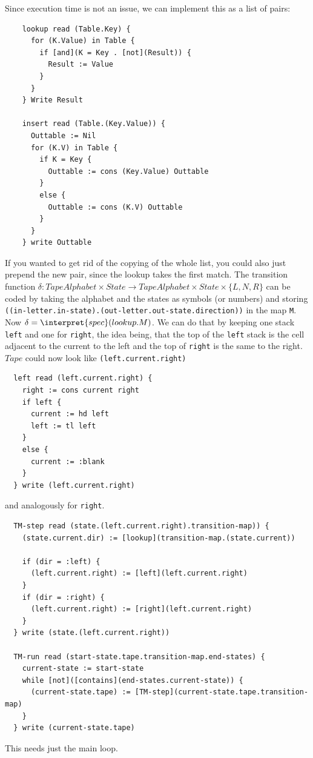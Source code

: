 \begin{Answer}
	\Question Since execution time is not an issue, we can implement this as a 
	list of pairs:

\begin{verbatim}
    lookup read (Table.Key) {
      for (K.Value) in Table {
        if [and](K = Key . [not](Result)) {
          Result := Value
        }
      }
    } Write Result

    insert read (Table.(Key.Value)) {
      Outtable := Nil
      for (K.V) in Table {
        if K = Key {
          Outtable := cons (Key.Value) Outtable
        }
        else {
          Outtable := cons (K.V) Outtable
        }
      }
    } write Outtable
\end{verbatim}

If you wanted to get rid of the copying of the whole list, you could also 
just prepend the new pair, since the lookup takes the first match.
	\Question The transition function 
	$\delta: TapeAlphabet \times State \rightarrow TapeAlphabet \times State\times \{L,N,R\}$
	can be coded by taking the alphabet and the states as symbols (or numbers) 
	and storing {\tt ((in-letter.in-state).(out-letter.out-state.direction))} 
	in the map {\tt M}. Now $\delta = \interpret{spec}(lookup.M)$.
	\Question
		\subQuestion We can do that by keeping one stack {\tt left} and one for 
		{\tt right}, the idea being, that the top of the {\tt left} stack is the 
		cell adjacent to the current to the left and the top of {\tt right} is 
		the same to the right. $Tape$ could now look like {\tt (left.current.right)}
		\subQuestion 
\begin{verbatim}
  left read (left.current.right) {
    right := cons current right
    if left {
      current := hd left
      left := tl left
    }
    else {
      current := :blank
    }
  } write (left.current.right)
\end{verbatim}
and analogously for {\tt right}.
	\Question
\begin{verbatim}
  TM-step read (state.(left.current.right).transition-map)) {
    (state.current.dir) := [lookup](transition-map.(state.current))

    if (dir = :left) {
      (left.current.right) := [left](left.current.right)
    }
    if (dir = :right) {
      (left.current.right) := [right](left.current.right)
    }
  } write (state.(left.current.right))

  TM-run read (start-state.tape.transition-map.end-states) {
    current-state := start-state
    while [not]([contains](end-states.current-state)) {
      (current-state.tape) := [TM-step](current-state.tape.transition-map)
    }
  } write (current-state.tape)
\end{verbatim}
	This needs just the main loop.
\end{Answer}

